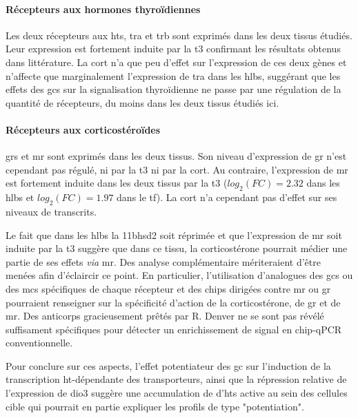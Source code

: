 \documentclass[../main.tex]{subfiles}
\begin{document}
\paragraph{Récepteurs aux hormones thyroïdiennes}
Les deux récepteurs aux \glspl{ht}, \gls{tra} et \gls{trb} sont exprimés dans les deux tissus étudiés.
Leur expression est fortement induite par la \gls{t3} confirmant les résultats obtenus dans littérature.
La \gls{cort} n'a que peu d'effet sur l'expression de ces deux gènes et n'affecte que marginalement l'expression de \gls{tra} dans les \glspl{hlb}, suggérant que les effets des \glspl{gc} sur la signalisation thyroïdienne ne passe par une régulation de la quantité de récepteurs, du moins dans les deux tissus étudiés ici.

\paragraph{Récepteurs aux corticostéroïdes}
\glspl{gr} et \gls{mr} sont exprimés dans les deux tissus.
Son niveau d'expression de \gls{gr} n'est cependant pas régulé, ni par la \gls{t3} ni par la \gls{cort}.
Au contraire, l'expression de \gls{mr} est fortement induite dans les deux tissus par la \gls{t3} ($log_2(FC)=2.32$ dans les \glspl{hlb} et $log_2(FC)=1.97$ dans le \gls{tf}).
La \gls{cort} n'a cependant pas d'effet sur ses niveaux de transcrits.
\par
Le fait que dans les \glspl{hlb} la \gls{11bhsd2} soit réprimée et que l'expression de \gls{mr} soit induite par la \gls{t3} suggère que dans ce tissu, la corticostérone pourrait médier une partie de ses effets \textit{via} \gls{mr}.
Des analyse complémentaire mériteraient d'être menées afin d'éclaircir ce point.
En particulier, l'utilisation d'analogues des \glspl{gc} ou des \glspl{mc} spécifiques de chaque récepteur et des \glspl{chip} dirigées contre \gls{mr} ou \gls{gr} pourraient renseigner sur la spécificité d'action de la corticostérone, de \gls{gr} et de \gls{mr}.
Des anticorps gracieusement prêtés par R. Denver ne se sont pas révélé suffisament spécifiques pour détecter un enrichissement de signal en \gls{chip}-qPCR conventionnelle.
\\
\par
Pour conclure sur ces aspects, l'effet potentiateur des \gls{gc} sur l'induction de la transcription \gls{ht}-dépendante des transporteurs, ainsi que la répression relative de l'expression de \gls{dio3} suggère une accumulation de d'\glspl{ht} active au sein des cellules cible qui pourrait en partie expliquer les profils de type "potentiation".
\end{document}
